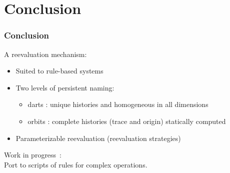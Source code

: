\documentclass[]{beamer}
\begin{document}
\section{Conclusion}

\begin{frame}
	\frametitle{Conclusion}
	A reevaluation mechanism:
	\begin{itemize}
		\item Suited to rule-based systems
		\item Two levels of persistent naming:
		      \begin{itemize}
			      \item darts : unique histories and homogeneous in all dimensions
			      \item orbits : complete histories (trace and origin) statically
			            computed
		      \end{itemize}
		\item Parameterizable reevaluation (reevaluation strategies)
	\end{itemize}

	Work in progress~:\\

	\hspace{2em} Port to scripts of rules for complex operations.
\end{frame}
\end{document}
